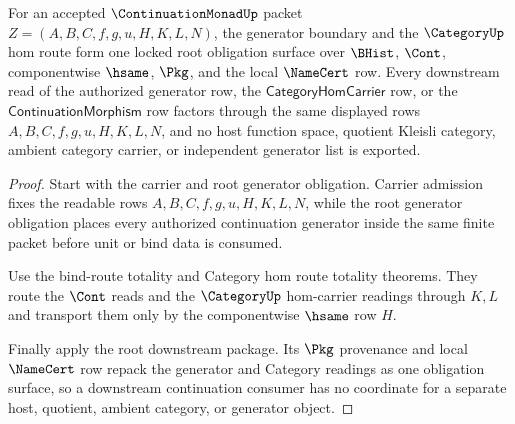 \begin{theorem}
\label{thm:continuation-monad-generator-category-lockdown}
For an accepted $\ContinuationMonadUp$ packet $Z=(A,B,C,f,g,u,H,K,L,N)$, the generator boundary and the $\CategoryUp$ hom route form one locked root obligation surface over $\BHist$, $\Cont$, componentwise $\hsame$, $\Pkg$, and the local $\NameCert$ row. Every downstream read of the authorized generator row, the $\mathsf{CategoryHomCarrier}$ row, or the $\mathsf{ContinuationMorphism}$ row factors through the same displayed rows $A,B,C,f,g,u,H,K,L,N$, and no host function space, quotient Kleisli category, ambient category carrier, or independent generator list is exported.
\end{theorem}
\begin{proof}
Start with the carrier and root generator obligation. Carrier admission fixes the readable rows $A,B,C,f,g,u,H,K,L,N$, while the root generator obligation places every authorized continuation generator inside the same finite packet before unit or bind data is consumed.

Use the bind-route totality and Category hom route totality theorems. They route the $\Cont$ reads and the $\CategoryUp$ hom-carrier readings through $K,L$ and transport them only by the componentwise $\hsame$ row $H$.

Finally apply the root downstream package. Its $\Pkg$ provenance and local $\NameCert$ row repack the generator and Category readings as one obligation surface, so a downstream continuation consumer has no coordinate for a separate host, quotient, ambient category, or generator object.
\end{proof}

